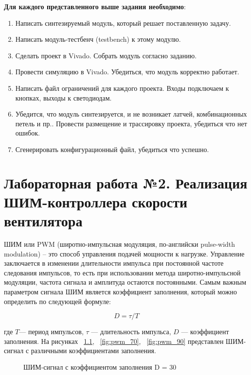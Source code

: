 \documentclass[a4paper,oneside ,10pt]{extreport}
\begin{document}
\textbf{Для каждого представленного выше задания необходимо}:
\begin{enumerate}
\item Написать синтезируемый модуль, который решает поставленную задачу.
\item Написать модуль-тестбенч (testbench) к этому модулю.
\item Сделать проект в Vivado. Собрать модуль согласно заданию. 
\item Провести симуляцию в Vivado. Убедиться, что модуль корректно работает.
\item Написать файл ограничений для каждого проекта. Входы подключаем к кнопках, выходы к светодиодам.
\item Убедится, что модуль синтезируется, и не возникает латчей, комбинационных петель и пр.. Провести размещение и трассировку проекта, убедиться что нет ошибок. 
\item Сгенерировать конфигурационный файл, убедиться что успешно.
\end{enumerate}

\chapter{Лабораторная работа №2. Реализация ШИМ-контроллера скорости вентилятора}

ШИМ или PWM (широтно-импульсная модуляция, по-английски pulse-width modulation) – это
способ управления подачей мощности к нагрузке. Управление заключается в изменении
длительности импульса при постоянной частоте следования импульсов, то есть при использовании метода широтно-импульсной модуляции, 
частота сигнала и амплитуда остаются постоянными. 
Самым важным параметром сигнала ШИМ является коэффициент заполнения, 
который можно определить по следующей формуле:

\begin{equation}	
	D =  \tau/T
\end{equation}

где \(T\)— период импульсов, \(\tau\)  — длительность импульса, \(D\) — коэффициент заполнения. На рисунках ~\ref{fig:pwm_30}, ~\ref{fig:pwm_70}, ~\ref{fig:pwm_90} представлен ШИМ-сигнал
с различными коэффициентами заполнения.

\begin{figure}[h]
    \centering
    \noindent
    \caption{ШИМ-сигнал с коэффициентом заполнения D = 30}
    \label{fig:pwm_30}
\end{figure}
\end{document}
